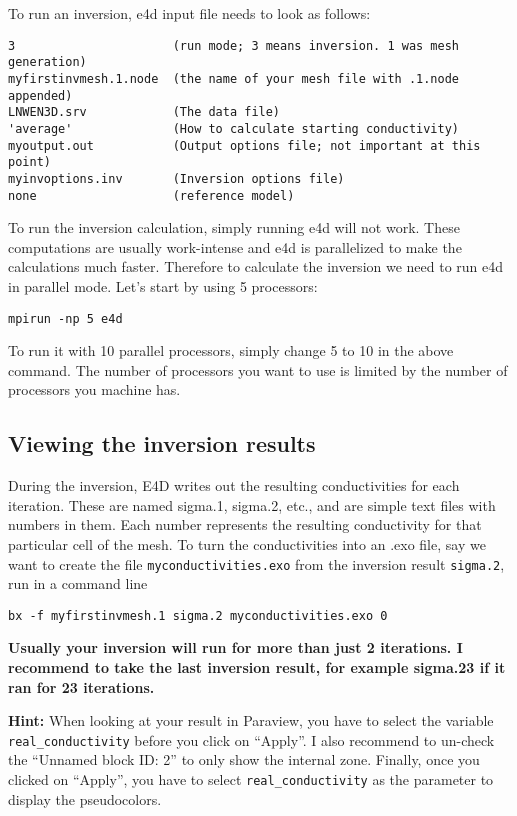 \documentclass[11pt]{article}
\begin{document}
To run an inversion, e4d input file needs to look as follows:

\verb+3                      (run mode; 3 means inversion. 1 was mesh generation)+\\
\verb+myfirstinvmesh.1.node  (the name of your mesh file with .1.node appended)+\\
\verb+LNWEN3D.srv            (The data file)+\\
\verb+'average'              (How to calculate starting conductivity)+\\
\verb+myoutput.out           (Output options file; not important at this point)+\\
\verb+myinvoptions.inv       (Inversion options file)+\\
\verb+none                   (reference model)+

\newpage

To run the inversion calculation, simply running e4d will not
work. These computations are usually work-intense and e4d is
parallelized to make the calculations much faster. Therefore to
calculate the inversion we need to run e4d in parallel mode. Let's
start by using 5 processors:

\qquad \verb+mpirun -np 5 e4d+

To run it with 10 parallel processors, simply change 5 to 10 in the
above command. The number of processors you want to use is limited by
the number of processors you machine has.


\subsection{Viewing the inversion results}

During the inversion, E4D writes out the resulting conductivities for
each iteration. These are named sigma.1, sigma.2, etc., and are simple
text files with numbers in them. Each number represents the resulting
conductivity for that particular cell of the mesh. To turn the
conductivities into an .exo file, say we want to create the file
\verb+myconductivities.exo+ from the inversion result \verb+sigma.2+,
run in a command line

\qquad \verb+bx -f myfirstinvmesh.1 sigma.2 myconductivities.exo 0+

\textbf{Usually your inversion will run for more than just 2
  iterations. I recommend to take the last inversion result, for
  example sigma.23 if it ran for 23 iterations.}

\textbf{Hint:} When looking at your result in Paraview, you have to
select the variable \verb+real_conductivity+ before you click on
``Apply''. I also recommend to un-check the ``Unnamed  block ID: 2''
to only show the internal zone. Finally, once you clicked on
``Apply'', you have to select \verb+real_conductivity+ as the
parameter to display the pseudocolors.   
\end{document}
